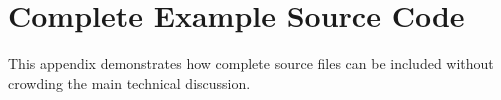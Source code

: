 \chapter{Complete Example Source Code}
\label{app:source-code}

This appendix demonstrates how complete source files can be included without crowding the main
technical discussion.


